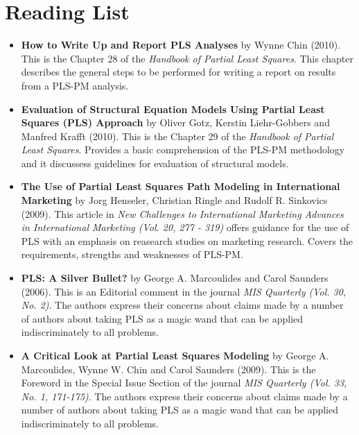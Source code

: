 \documentclass[12pt]{book}\usepackage{graphicx, color}
\begin{document}
\section{Reading List}
\begin{itemize}
 \item \textbf{\textsf{How to Write Up and Report PLS Analyses}} by Wynne Chin (2010). This is the Chapter 28 of the \textit{Handbook of Partial Least Squares}. This chapter describes the general steps to be performed for writing a report on results from a PLS-PM analysis.

 \vspace{2mm}
 \item \textbf{\textsf{Evaluation of Structural Equation Models Using Partial Least Squares (PLS) Approach}} by Oliver Gotz, Kerstin Liehr-Gobbers and Manfred Krafft (2010). This is the Chapter 29 of the \textit{Handbook of Partial Least Squares}. Provides a basic comprehension of the PLS-PM methodology and it discussess guidelines for evaluation of structural models.

 \vspace{2mm}
 \item \textbf{\textsf{The Use of Partial Least Squares Path Modeling in International Marketing}} by Jorg Henseler, Christian Ringle and Rudolf R. Sinkovics (2009). This article in \textit{New Challenges to International Marketing Advances in International Marketing (Vol. 20, 277 - 319)} offers guidance for the use of PLS with an emphasis on reasearch studies on marketing research. Covers the requirements, strengths and weaknesses of PLS-PM.

 \vspace{2mm}
 \item \textbf{\textsf{PLS: A Silver Bullet?}} by George A. Marcoulides and Carol Saunders (2006). This is an Editorial comment in the journal \textit{MIS Quarterly (Vol. 30, No. 2)}. The authors express their concerns about claims made by a number of authors about taking PLS as a magic wand that can be applied indiscriminately to all problems.

 \vspace{2mm}
 \item \textbf{\textsf{A Critical Look at Partial Least Squares Modeling}} by George A. Marcoulides, Wynne W. Chin and Carol Saunders (2009). This is the Foreword in the Special Issue Section of the journal \textit{MIS Quarterly (Vol. 33, No. 1, 171-175)}. The authors express their concerns about claims made by a number of authors about taking PLS as a magic wand that can be applied indiscriminately to all problems.
\end{itemize}
  
\end{document}
